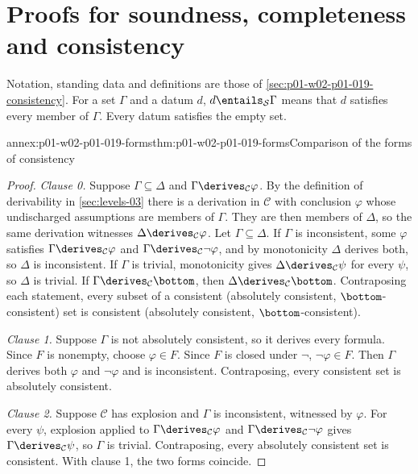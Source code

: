 \section{Proofs for soundness, completeness and consistency}
\label{sec:annex-p01-w02-p01-019-consistency}

Notation, standing data and definitions are those of
\cref{sec:p01-w02-p01-019-consistency}. For a set \(\Gamma\) and a datum
\(d\), \(d\entails_{\mathcal S}\Gamma\) means that \(d\) satisfies every
member of \(\Gamma\). Every datum satisfies the empty set.

\begin{annexitem}{annex:p01-w02-p01-019-forms}{thm:p01-w02-p01-019-forms}{Comparison of the forms of consistency}
\begin{proof}
\emph{Clause 0.} Suppose \(\Gamma\subseteq\Delta\) and
\(\Gamma\derives_{\mathcal C}\varphi\). By the definition of derivability in
\cref{sec:levels-03} there is a derivation in \(\mathcal C\) with conclusion
\(\varphi\) whose undischarged assumptions are members of \(\Gamma\). They are
then members of \(\Delta\), so the same derivation witnesses
\(\Delta\derives_{\mathcal C}\varphi\). Let \(\Gamma\subseteq\Delta\). If
\(\Gamma\) is inconsistent, some \(\varphi\) satisfies
\(\Gamma\derives_{\mathcal C}\varphi\) and
\(\Gamma\derives_{\mathcal C}\neg\varphi\), and by monotonicity \(\Delta\)
derives both, so \(\Delta\) is inconsistent. If \(\Gamma\) is trivial,
monotonicity gives \(\Delta\derives_{\mathcal C}\psi\) for every \(\psi\), so
\(\Delta\) is trivial. If \(\Gamma\derives_{\mathcal C}\bottom\), then
\(\Delta\derives_{\mathcal C}\bottom\). Contraposing each statement, every
subset of a consistent (absolutely consistent, \(\bottom\)-consistent) set is
consistent (absolutely consistent, \(\bottom\)-consistent).

\emph{Clause 1.} Suppose \(\Gamma\) is not absolutely consistent, so it
derives every formula. Since \(F\) is nonempty, choose \(\varphi\in F\). Since
\(F\) is closed under \(\neg\), \(\neg\varphi\in F\). Then \(\Gamma\) derives
both \(\varphi\) and \(\neg\varphi\) and is inconsistent. Contraposing, every
consistent set is absolutely consistent.

\emph{Clause 2.} Suppose \(\mathcal C\) has explosion and \(\Gamma\) is
inconsistent, witnessed by \(\varphi\). For every \(\psi\), explosion applied
to \(\Gamma\derives_{\mathcal C}\varphi\) and
\(\Gamma\derives_{\mathcal C}\neg\varphi\) gives
\(\Gamma\derives_{\mathcal C}\psi\), so \(\Gamma\) is trivial. Contraposing,
every absolutely consistent set is consistent. With clause 1, the two forms
coincide.


\end{proof}
\end{annexitem}
